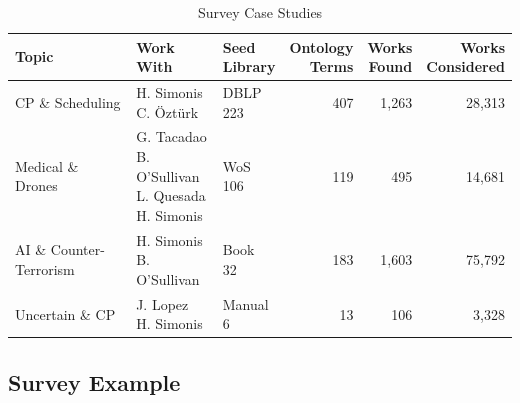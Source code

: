\documentclass[
 hf]{ceurart}
\begin{document}
\begin{table}[htbp]
\caption{\label{tab:casestudies}Survey Case Studies}
\begin{tabular}{lllrrr}\toprule
Topic & \shortstack{Work\\With} & \shortstack{Seed\\Library} & \shortstack{Ontology\\Terms} & \shortstack{Works\\Found} & \shortstack{Works\\Considered}\\ \midrule 
CP \& Scheduling &\shortstack[l]{H. Simonis\\C. Öztürk}  & \shortstack[l]{DBLP\\223}& 407 & 1,263 & 28,313\\\midrule 
Medical \& Drones & \shortstack[l]{G. Tacadao\\B. O'Sullivan\\L. Quesada\\H. Simonis} & \shortstack[l]{WoS\\106} & 119& 495 & 14,681\\\midrule 
AI \& Counter-Terrorism & \shortstack[l]{H. Simonis\\B. O'Sullivan} & \shortstack[l]{Book\\32} & 183 & 1,603 & 75,792\\\midrule
Uncertain \& CP & \shortstack[l]{J. Lopez\\H. Simonis} & \shortstack[l]{Manual\\6} & 13 & 106 & 3,328\\
\bottomrule
\end{tabular} 
\end{table}


\subsection{Survey Example}
\end{document}
